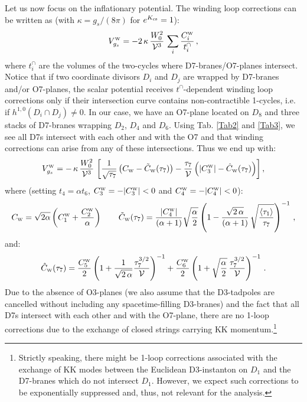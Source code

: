 \documentclass[11pt,a4paper]{article}
\newcommand{\be}{\begin{equation}}
\newcommand{\ee}{\end{equation}}
\def\W{{\scriptscriptstyle \rm W}}
\newcommand\vo{{\mathcal{V}}}
\begin{document}
Let us now focus on the inflationary potential. The winding loop corrections can be written as (with $\kappa=g_s/(8\pi)$ for $e^{K_{\rm cs}}=1$):
\be
V^\W_{g_s}=-2\,\kappa\,\frac{W_0^2}{\vo^3}\,\sum_i\frac{C_i^\W}{t_i^\cap}\,,
\ee 
where $t_i^\cap$ are the volumes of the two-cycles where D7-branes/O7-planes intersect. Notice that if two coordinate divisors $D_i$ and $D_j$ are wrapped by D7-branes and/or O7-planes, the scalar potential receives $t^\cap$-dependent winding loop corrections only if their intersection curve contains
non-contractible 1-cycles, i.e. if $h^{1,0}(D_i \cap D_j)\neq 0$. In our case, we have an O7-plane located on $D_8$ and three stacks of D7-branes wrapping $D_2$, $D_4$ and $D_6$. Using Tab. \ref{Tab2} and \ref{Tab3}, we see all D7s intersect with each other and with the O7 and that winding corrections can arise from any of these intersections.  Thus we end up with: 
\be
V^\W_{g_s} =-\,\kappa\,\frac{W_0^2}{\vo^3}\,
\left[\frac{1}{\sqrt{\tau_7}} \left( C_\W - \tilde{C}_\W(\tau_7)\right) -\frac{\tau_7}{\vo} \left(|C_3^\W| - \hat{C}_\W(\tau_7)\right)\right],
\ee
where (setting $t_4=\alpha t_6$, $C_3^\W = - |C_3^\W|<0$ and $C_4^\W = - |C_4^\W|<0$):
\be
C_\W = \sqrt{2\alpha}\left(C_1^\W+\frac{C_2^\W}{\alpha}\right) \qquad 
\tilde{C}_\W (\tau_7)= \frac{|C_4^\W|}{(\alpha+1)}\sqrt{\frac{\alpha}{2}}\left(1-\frac{\sqrt{2\,\alpha}}{(\alpha+1)}\,\sqrt{\frac{\langle\tau_1\rangle}{\tau_7}}\right)^{-1}\,,
\ee
and:
\be
\hat{C}_\W (\tau_7) = \frac{C_5^\W}{2} \left(1+\frac{1}{\sqrt{2\,\alpha}}\frac{\tau_7^{3/2}}{\vo}\right)^{-1}
+ \frac{C_6^\W}{2} \left(1+\sqrt{\frac{\alpha}{2}}\,\frac{\tau_7^{3/2}}{\vo}\right)^{-1}\,.
\ee
Due to the absence of O3-planes (we also assume that the D3-tadpoles are cancelled without including any spacetime-filling D3-branes) and the fact that all D7s intersect with each other and with the O7-plane, there are no 1-loop corrections due to the exchange of closed strings carrying KK momentum.\footnote{Strictly speaking, there might be 1-loop corrections associated with the exchange of KK modes between the Euclidean D3-instanton on $D_1$ and the D7-branes which do not intersect $D_1$. However, we expect such corrections to be exponentially suppressed and, thus, not relevant for the analysis.}
\end{document}
